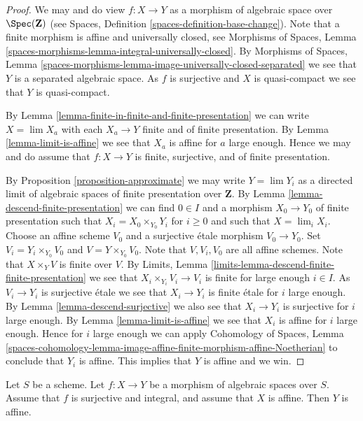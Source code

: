 \begin{proof}
We may and do view $f : X \to Y$ as a morphism of algebraic space over
$\Spec(\mathbf{Z})$ (see
Spaces, Definition \ref{spaces-definition-base-change}).
Note that a finite morphism is affine and universally closed, see
Morphisms of Spaces, Lemma
\ref{spaces-morphisms-lemma-integral-universally-closed}.
By Morphisms of Spaces, Lemma
\ref{spaces-morphisms-lemma-image-universally-closed-separated}
we see that $Y$ is a separated algebraic space.
As $f$ is surjective and $X$ is quasi-compact we see that $Y$ is
quasi-compact.

\medskip\noindent
By Lemma \ref{lemma-finite-in-finite-and-finite-presentation}
we can write $X = \lim X_a$ with each $X_a \to Y$ finite and of
finite presentation. By
Lemma \ref{lemma-limit-is-affine}
we see that $X_a$ is affine for $a$ large enough.
Hence we may and do assume that $f : X \to Y$ is finite, surjective, and
of finite presentation.

\medskip\noindent
By Proposition \ref{proposition-approximate} we may write
$Y = \lim Y_i$ as a directed limit of algebraic
spaces of finite presentation over $\mathbf{Z}$.
By Lemma \ref{lemma-descend-finite-presentation} we can
find $0 \in I$ and a morphism $X_0 \to Y_0$ of finite presentation
such that $X_i = X_0 \times_{Y_0} Y_i$ for $i \geq 0$
and such that $X = \lim_i X_i$. Choose an affine scheme $V_0$
and a surjective \'etale morphism $V_0 \to Y_0$. Set
$V_i = Y_i \times_{Y_0} V_0$ and $V = Y \times_{Y_0} V_0$.
Note that $V, V_i, V_0$ are all affine schemes.
Note that $X \times_Y V$ is finite over $V$. By
Limits, Lemma \ref{limits-lemma-descend-finite-finite-presentation}
we see that $X_i \times_{Y_i} V_i \to V_i$ is finite for
large enough $i \in I$. As $V_i \to Y_i$ is surjective \'etale
we see that $X_i \to Y_i$ is finite \'etale for $i$ large enough.
By Lemma \ref{lemma-descend-surjective}
we also see that $X_i \to Y_i$ is surjective for $i$ large enough.
By Lemma \ref{lemma-limit-is-affine} we see that $X_i$ is
affine for $i$ large enough. Hence for $i$ large enough we can apply
Cohomology of Spaces, Lemma
\ref{spaces-cohomology-lemma-image-affine-finite-morphism-affine-Noetherian}
to conclude that $Y_i$ is affine. This implies that $Y$ is affine and
we win.
\end{proof}

\begin{proposition}
\label{proposition-affine}
Let $S$ be a scheme. Let $f : X \to Y$ be a morphism of algebraic spaces
over $S$. Assume that $f$ is surjective and integral, and assume that $X$
is affine. Then $Y$ is affine.
\end{proposition}

